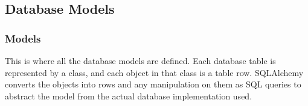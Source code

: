 \documentclass[letterpaper,10pt,english]{manual}
\begin{document}
\resetcurrentobjects
\hypertarget{--doc-models}{}

\subsection{Database Models}
\hypertarget{module-webscavator.model.models}{}
\modulesynopsis{}

\subsubsection{Models}

This is where all the database models are defined. 
Each database table is represented by a class, and each object in that class is a table row. 
SQLAlchemy converts the objects into rows and any manipulation on them as SQL queries 
to abstract the model from the actual database implementation used.
\end{document}
